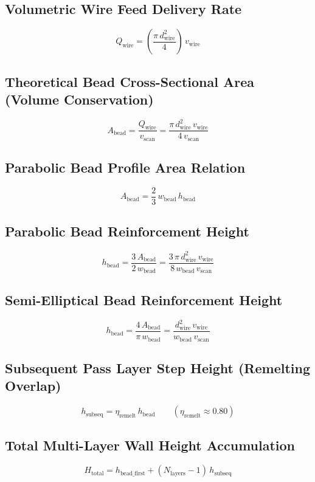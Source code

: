 \documentclass[10pt,a4paper]{article}
\begin{document}
\subsection*{Volumetric Wire Feed Delivery Rate}
\[
Q_{\mathrm{wire}} = \left(\frac{\pi\,d_{\mathrm{wire}}^2}{4}\right)\,v_{\mathrm{wire}}
\]

\subsection*{Theoretical Bead Cross-Sectional Area (Volume Conservation)}
\[
A_{\mathrm{bead}} = \frac{Q_{\mathrm{wire}}}{v_{\mathrm{scan}}} = \frac{\pi\,d_{\mathrm{wire}}^2\,v_{\mathrm{wire}}}{4\,v_{\mathrm{scan}}}
\]

\subsection*{Parabolic Bead Profile Area Relation}
\[
A_{\mathrm{bead}} = \frac{2}{3}\,w_{\mathrm{bead}}\,h_{\mathrm{bead}}
\]

\subsection*{Parabolic Bead Reinforcement Height}
\[
h_{\mathrm{bead}} = \frac{3\,A_{\mathrm{bead}}}{2\,w_{\mathrm{bead}}} = \frac{3\,\pi\,d_{\mathrm{wire}}^2\,v_{\mathrm{wire}}}{8\,w_{\mathrm{bead}}\,v_{\mathrm{scan}}}
\]

\subsection*{Semi-Elliptical Bead Reinforcement Height}
\[
h_{\mathrm{bead}} = \frac{4\,A_{\mathrm{bead}}}{\pi\,w_{\mathrm{bead}}} = \frac{d_{\mathrm{wire}}^2\,v_{\mathrm{wire}}}{w_{\mathrm{bead}}\,v_{\mathrm{scan}}}
\]

\subsection*{Subsequent Pass Layer Step Height (Remelting Overlap)}
\[
h_{\mathrm{subseq}} = \eta_{\mathrm{remelt}}\,h_{\mathrm{bead}} \qquad (\eta_{\mathrm{remelt}} \approx 0.80)
\]

\subsection*{Total Multi-Layer Wall Height Accumulation}
\[
H_{\mathrm{total}} = h_{\mathrm{bead\_first}} + (N_{\mathrm{layers}} - 1)\,h_{\mathrm{subseq}}
\]
\end{document}
